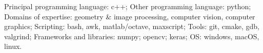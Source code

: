 
\begin{center}
\vspace{0.0mm}
\end{center}

\begin{cvskills}
  \cvskill
    {Principal programming language:}
    {c++;}
  \cvskill
    {Other programming language:}
    {python;}
  \cvskill
    {Domains of expertise:}
    {geometry \& image processing, computer vision, computer graphics;}
  \cvskill
    {Scripting:}
    {bash, awk, matlab/octave, maxscript;}
  \cvskill
    {Tools:}
    {git, cmake, gdb, valgrind;}
  \cvskill
    {Frameworks and libraries:}
    {numpy; opencv; keras;}
  \cvskill
    {OS:}
    {windows, macOS, linux.}
\end{cvskills}

\begin{center}
\vspace{20.0mm}
\end{center}

%
